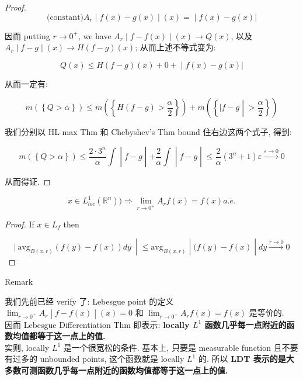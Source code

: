 \begin{proof}
\[\left. \text{(constant)} A_{r} \middle| f(x) - g(x) \middle| (x) = \middle| f(x) - g(x)| \right.\]

因而 putting \(r\rightarrow 0^{+}\), we have \(\left. A_{r} \middle| f - f(x) \middle| (x)\rightarrow Q(x) \right.\), 以及 \(\left. A_{r} \middle| f - g \middle| (x)\rightarrow H(f - g)(x) \right.\); 从而上述不等式变为:

\[\left. Q(x) \leq H(f - g)(x) + 0 + \middle| f(x) - g(x)| \right.\]

从而一定有:

\[m(\left\{ {Q > \alpha} \right\}) \leq m(\left\{ {H(f - g) > \frac{\alpha}{2}} \right\}) + m(\left\{ |f - g \middle| > \frac{\alpha}{2} \right\})\]

我们分别以 HL max Thm 和 Chebyshev's Thm bound 住右边这两个式子, 得到:

\[\left. m(\left\{ {Q > \alpha} \right\}) \leq \frac{2 \cdot 3^{n}}{\alpha}\int \middle| f - g \middle| + \frac{2}{\alpha}\int \middle| f - g \middle| \leq \frac{2}{\alpha}(3^{n} + 1)\varepsilon\overset{\varepsilon\rightarrow 0}{\rightarrow}0 \right.\]

从而得证.

\end{proof}

\begin{corollary}

\[x \in L_{loc}^{1}(\mathbb{R}^{n}))\Longrightarrow\lim\limits_{r\rightarrow 0^{+}}A_{r}f(x) = f(x) a.e.\]

\end{corollary}

\begin{proof}

If \(x \in L_{f}\) then

\[\left. |\ \text{avg}_{B(x,r)}(f(y) - f(x)) dy\  \middle| \leq \text{avg}_{B(x,r)} \middle| (f(y) - f(x) \middle| dy\overset{r\rightarrow 0}{\rightarrow}0 \right.\]

\end{proof}

\begin{qlremark}{Remark}

我们先前已经 verify 了: Lebesgue point 的定义 \(\left. \lim_{r\rightarrow 0^{+}}A_{r} \middle| f - f(x) \middle| (x) = 0 \right.\) 和 \(\lim_{r\rightarrow 0^{+}}A_{r}f(x) = f(x)\) 是等价的.\\
因而 Lebesgue Differentiation Thm 即表示: \textbf{locally \(L^{1}\) 函数几乎每一点附近的函数均值都等于这一点上的值.}\\
实则, locally \(L^{1}\) 是一个很宽松的条件. 基本上, 只要是 measurable function 且不要有过多的 unbounded points, 这个函数就是 locally \(L^{1}\) 的. 所以 \textbf{LDT 表示的是大多数可测函数几乎每一点附近的函数均值都等于这一点上的值.}\\

\end{qlremark}

